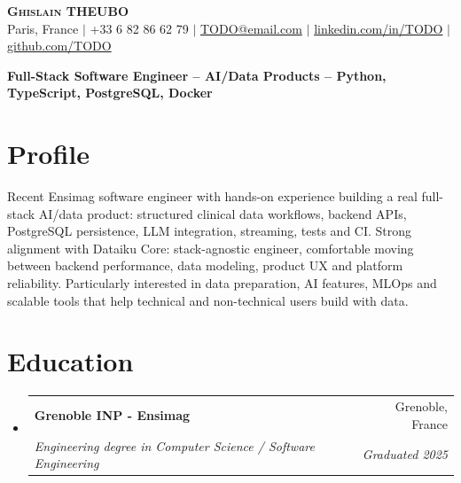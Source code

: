 \documentclass[letterpaper,11pt]{article}
\makeatletter
\newcommand{\resumeSubheading}[4]{
  \vspace{-2pt}\item
    \begin{tabular*}{0.97\textwidth}[t]{l@{\extracolsep{\fill}}r}
      \textbf{#1} & #2 \\
      \textit{\small#3} & \textit{\small #4} \\
    \end{tabular*}\vspace{-7pt}
}
\newcommand{\resumeSubHeadingListStart}{\begin{itemize}[leftmargin=0.15in, label={}]}
\newcommand{\resumeSubHeadingListEnd}{\end{itemize}}
\makeatother
\begin{document}
\begin{center}
    \textbf{\Huge \scshape Ghislain THEUBO} \\ \vspace{2pt}
    \small Paris, France $|$ +33 6 82 86 62 79 $|$
    \href{mailto:TODO@email.com}{TODO@email.com} $|$
    \href{https://www.linkedin.com/in/TODO}{linkedin.com/in/TODO} $|$
    \href{https://github.com/TODO}{github.com/TODO}
\end{center}

\vspace{-8pt}
\begin{center}
    \textbf{Full-Stack Software Engineer -- AI/Data Products -- Python, TypeScript, PostgreSQL, Docker}
\end{center}
\vspace{-8pt}

\section{Profile}
\small{
Recent Ensimag software engineer with hands-on experience building a real full-stack AI/data product: structured clinical data workflows, backend APIs, PostgreSQL persistence, LLM integration, streaming, tests and CI. Strong alignment with Dataiku Core: stack-agnostic engineer, comfortable moving between backend performance, data modeling, product UX and platform reliability. Particularly interested in data preparation, AI features, MLOps and scalable tools that help technical and non-technical users build with data.
}

\section{Education}
\resumeSubHeadingListStart
  \resumeSubheading
    {Grenoble INP - Ensimag}{Grenoble, France}
    {Engineering degree in Computer Science / Software Engineering}{Graduated 2025}
\resumeSubHeadingListEnd
\end{document}
